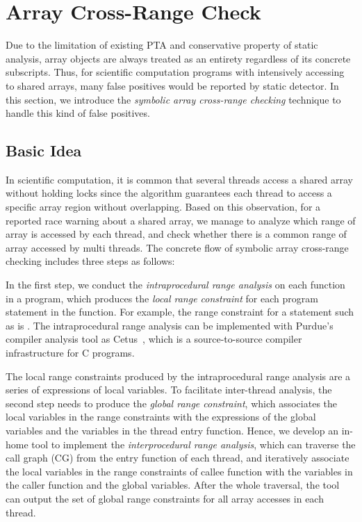 \documentclass[10pt,onecolumn,letterpaper]{article}
\begin{document}
\section{Array Cross-Range Check}
Due to the limitation of existing PTA and conservative property of
static analysis, array objects are always treated as an entirety
regardless of its concrete subscripts. Thus, for scientific
computation programs with intensively accessing to shared arrays,
many false positives would be reported by static detector. In this
section, we introduce the \emph{symbolic array cross-range checking}
technique to handle this kind of false positives.

\subsection{Basic Idea}
In scientific computation, it is common that several threads access
a shared array without holding locks since the algorithm guarantees
each thread to access a specific array region without overlapping.
Based on this observation, for a reported race warning about a
shared array, we manage to analyze which range of array is accessed
by each thread, and check whether there is a common range of array
accessed by multi threads. The concrete flow of symbolic array
cross-range checking includes three steps as follows:

In the first step, we conduct the \emph{intraprocedural range
analysis} on each function in a program, which produces the
\emph{local range constraint} for each program statement in the
function. For example, the range constraint for a statement such as
 is . The intraprocedural
range analysis can be implemented with Purdue's compiler analysis
tool as Cetus~\cite{Dave09Computer}, which is a source-to-source
compiler infrastructure for C programs.

The local range constraints produced by the intraprocedural range
analysis are a series of expressions of local variables. To
facilitate inter-thread analysis, the second step needs to produce
the \emph{global range constraint}, which associates the local
variables in the range constraints with the expressions of the
global variables and the variables in the thread entry function.
Hence, we develop an in-home tool to implement the
\emph{interprocedural range analysis}, which can traverse the call
graph (CG) from the entry function of each thread, and iteratively
associate the local variables in the range constraints of callee
function with the variables in the caller function and the global
variables. After the whole traversal, the tool can output the set of
global range constraints for all array accesses in each thread.
\end{document}
